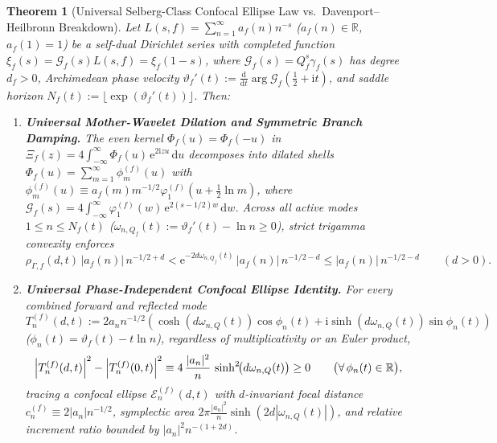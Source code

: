 \documentclass[11pt,reqno]{amsart}
\newtheorem{theorem}{Theorem}[section]
\theoremstyle{definition}
\theoremstyle{remark}
\numberwithin{equation}{section}
\newcommand{\R}{\mathbb{R}}
\newcommand{\dd}{\mathrm{d}}
\newcommand{\ee}{\mathrm{e}}
\newcommand{\ii}{\mathrm{i}}
\begin{document}
\begin{theorem}[Universal Selberg-Class Confocal Ellipse Law vs.\ Davenport--Heilbronn Breakdown]\label{thm:main}
Let $L(s,f) = \sum_{n=1}^\infty a_f(n)n^{-s}$ ($a_f(n) \in \R$, $a_f(1) = 1$) be a self-dual Dirichlet series with completed function $\xi_f(s) = \mathcal{G}_f(s)L(s,f) = \xi_f(1-s)$, where $\mathcal{G}_f(s) = Q_f^s\gamma_f(s)$ has degree $d_f > 0$, Archimedean phase velocity $\vartheta_f'(t) := \frac{\dd}{\dd t}\arg\mathcal{G}_f(\frac{1}{2}+\ii t)$, and saddle horizon $N_f(t) := \lfloor\exp(\vartheta_f'(t))\rfloor$. Then:
\begin{enumerate}[label=\textup{(\roman*)},leftmargin=2.2em]
\item \textbf{Universal Mother-Wavelet Dilation and Symmetric Branch Damping.} The even kernel $\Phi_f(u) = \Phi_f(-u)$ in $\Xi_f(z) = 4\int_{-\infty}^\infty \Phi_f(u)\,\ee^{2\ii zu}\,\dd u$ decomposes into dilated shells $\Phi_f(u) = \sum_{m=1}^\infty \phi_m^{(f)}(u)$ with $\phi_m^{(f)}(u) \equiv a_f(m)m^{-1/2}\varphi_1^{(f)}(u + \frac{1}{2}\ln m)$, where $\mathcal{G}_f(s) = 4\int_{-\infty}^\infty \varphi_1^{(f)}(w)\,\ee^{2(s-1/2)w}\,\dd w$. Across all active modes $1 \le n \le N_f(t)$ ($\omega_{n,Q_f}(t) := \vartheta_f'(t) - \ln n \ge 0$), strict trigamma convexity enforces
\begin{equation}\label{eq:intro_branch_damping}
\rho_{\Gamma,f}(d,t)\,\bigl|a_f(n)\bigr|\,n^{-1/2+d} < \ee^{-2d\omega_{n,Q_f}(t)}\,\bigl|a_f(n)\bigr|\,n^{-1/2-d} \le \bigl|a_f(n)\bigr|\,n^{-1/2-d} \qquad (d > 0).
\end{equation}
\item \textbf{Universal Phase-Independent Confocal Ellipse Identity.} For every combined forward and reflected mode $T_n^{(f)}(d,t) := 2a_n n^{-1/2}(\cosh(d\omega_{n,Q}(t))\cos\phi_n(t) + \ii\sinh(d\omega_{n,Q}(t))\sin\phi_n(t))$ ($\phi_n(t) = \vartheta_f(t) - t\ln n$), regardless of multiplicativity or an Euler product,
\begin{equation}\label{eq:intro_confocal_ellipse}
\Bigl|T_n^{(f)}(d,t)\Bigr|^2 - \Bigl|T_n^{(f)}(0,t)\Bigr|^2 \equiv 4\,\frac{|a_n|^2}{n}\,\sinh^2\!\bigl(d\omega_{n,Q}(t)\bigr) \ge 0 \qquad \bigl(\forall\,\phi_n(t) \in \R\bigr),
\end{equation}
tracing a confocal ellipse $\mathcal{E}_n^{(f)}(d,t)$ with $d$-invariant focal distance $c_n^{(f)} \equiv 2|a_n|n^{-1/2}$, symplectic area $2\pi\frac{|a_n|^2}{n}\sinh(2d|\omega_{n,Q}(t)|)$, and relative increment ratio bounded by $|a_n|^2 n^{-(1+2d)}$.

\end{enumerate}
\end{theorem}
\end{document}
